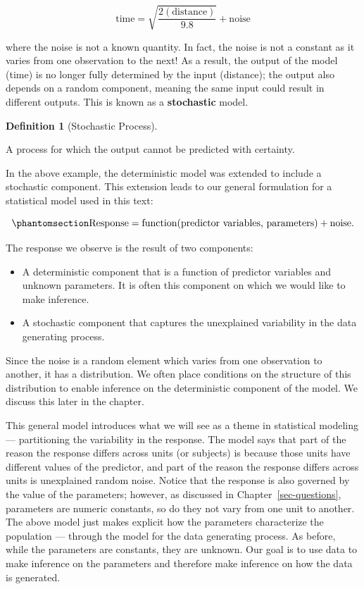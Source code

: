 \documentclass[
  letterpaper,
  DIV=11,
  numbers=noendperiod]{scrreprt}
\providecommand{\tightlist}{%
  \setlength{\itemsep}{0pt}\setlength{\parskip}{0pt}}\usepackage{longtable,booktabs,array}
\theoremstyle{definition}
\newtheorem{definition}{Definition}[chapter]
\theoremstyle{definition}
\theoremstyle{plain}
\theoremstyle{remark}
\begin{document}
\[\text{time} = \sqrt{\frac{2(\text{distance})}{9.8}} + \text{noise}\]

where the noise is not a known quantity. In fact, the noise is not a
constant as it varies from one observation to the next! As a result, the
output of the model (time) is no longer fully determined by the input
(distance); the output also depends on a random component, meaning the
same input could result in different outputs. This is known as a
\textbf{stochastic} model.

\begin{definition}[Stochastic
Process]\protect\hypertarget{def-stochastic-process}{}\label{def-stochastic-process}

A process for which the output cannot be predicted with certainty.

\end{definition}

In the above example, the deterministic model was extended to include a
stochastic component. This extension leads to our general formulation
for a statistical model used in this text:

\begin{equation}\phantomsection\label{eq-general-model}{
\text{Response} = \text{function}(\text{predictor variables, parameters}) + \text{noise}.
}\end{equation}

The response we observe is the result of two components:

\begin{itemize}
\tightlist
\item
  A deterministic component that is a function of predictor variables
  and unknown parameters. It is often this component on which we would
  like to make inference.
\item
  A stochastic component that captures the unexplained variability in
  the data generating process.
\end{itemize}

Since the noise is a random element which varies from one observation to
another, it has a distribution. We often place conditions on the
structure of this distribution to enable inference on the deterministic
component of the model. We discuss this later in the chapter.

This general model introduces what we will see as a theme in statistical
modeling --- partitioning the variability in the response. The model
says that part of the reason the response differs across units (or
subjects) is because those units have different values of the predictor,
and part of the reason the response differs across units is unexplained
random noise. Notice that the response is also governed by the value of
the parameters; however, as discussed in Chapter~\ref{sec-questions},
parameters are numeric constants, so do they not vary from one unit to
another. The above model just makes explicit how the parameters
characterize the population --- through the model for the data
generating process. As before, while the parameters are constants, they
are unknown. Our goal is to use data to make inference on the parameters
and therefore make inference on how the data is generated.
\end{document}
